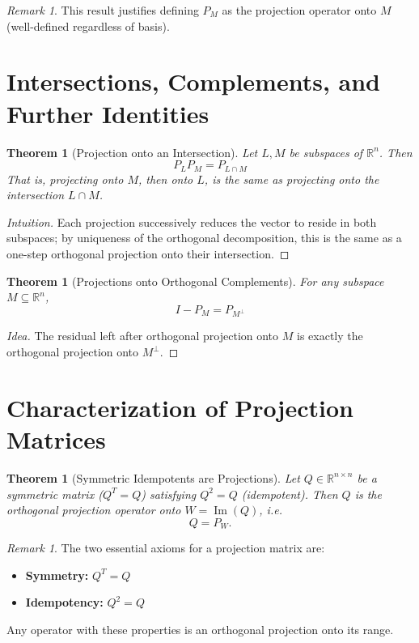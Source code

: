 \documentclass[12pt]{article}
\theoremstyle{definition}
\theoremstyle{plain}
\newtheorem{theorem}[definition]{Theorem}
\theoremstyle{remark}
\newtheorem{remark}[definition]{Remark}
\begin{document}
\begin{remark}
    This result justifies defining $P_M$ as the projection operator onto $M$ (well-defined regardless of basis).
\end{remark}

\section{Intersections, Complements, and Further Identities}

\begin{theorem}[Projection onto an Intersection]
    Let $L, M$ be subspaces of $\mathbb{R}^n$. Then
    \[
        P_L P_M = P_{L \cap M}
    \]
    That is, projecting onto $M$, then onto $L$, is the same as projecting onto the intersection $L \cap M$.
\end{theorem}
\begin{proof}[Intuition]
  Each projection successively reduces the vector to reside in both subspaces; by uniqueness of the orthogonal decomposition, this is the same as a one-step orthogonal projection onto their intersection.
\end{proof}

\begin{theorem}[Projections onto Orthogonal Complements]
    For any subspace $M \subseteq \mathbb{R}^n$,
    \[
        I - P_M = P_{M^{\perp}}
    \]
\end{theorem}
\begin{proof}[Idea]
    The residual left after orthogonal projection onto $M$ is exactly the orthogonal projection onto $M^{\perp}$.
\end{proof}

\section{Characterization of Projection Matrices}

\begin{theorem}[Symmetric Idempotents are Projections]
    Let $Q \in \mathbb{R}^{n \times n}$ be a symmetric matrix ($Q^T = Q$) satisfying $Q^2 = Q$ (idempotent). Then $Q$ is the orthogonal projection operator onto $W = \operatorname{Im}(Q)$, i.e.
    \[
        Q = P_W.
    \]
\end{theorem}

\begin{remark}
    The two essential axioms for a projection matrix are:
    \begin{itemize}
        \item \textbf{Symmetry:} $Q^T = Q$
        \item \textbf{Idempotency:} $Q^2 = Q$
    \end{itemize}
    Any operator with these properties is an orthogonal projection onto its range.
\end{remark}
\end{document}
